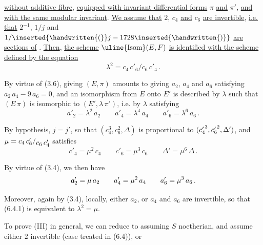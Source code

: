 %
\space
\uline{without additive fibre}, \uline{equipped with invariant differential forms} $\pi$ \uline{and} $\pi'$, \uline{and with the same modular invariant}. \uline{We assume that} $2$, $c_4$ \uline{and} $c_6$ \uline{are invertible}, \uline{i.e.} \uline{that} $2^{-1}$, $1/j$ and $1/\inserted{\handwritten{(}}j-1728\inserted{\handwritten{)}}$ \uline{are sections of} \reversemarginpar{}\normalmarginpar. \uline{Then}, \uline{the scheme} $\text{\uline{Isom}}(E,F)$ \uline{is identified with the scheme defined by the equation}
\[
\lambda^2=c_4\,c'_6/c_6\,c'_4 \, .
\]

By virtue of (3.6), giving $(E,\pi)$ amounts to giving $a_2$, $a_4$ and $a_6$ satisfying $a_2\,a_4-9\,a_6=0$, and an isomorphism from $E$ onto $E'$ is described by $\lambda$ such that $(E\,\pi)$ is isomorphic to $(E',\lambda\,\pi')$, i.e. by $\lambda$ satisfying
\[
a'_2=\lambda^2\,a_2 \qquad a'_4=\lambda^4\,a_4 \qquad a'_6=\lambda^6\,a_6 \, . \tag*{(6.4.1)}
\]

By hypothesis, $j=j'$, so that $(c_4^3,c_6^2,\Delta)$ is proportional to $(c_4^{\raisebox{-.38ex}{$\scriptstyle\prime$}\,3},c_6^{\raisebox{-.38ex}{$\scriptstyle\prime$}\,2},\Delta')$, and $\mu=c_4\,c'_6/\raisebox{-.52ex}{$c_6\,c'_4$}$ satisfies
\[
c'_4=\mu^2\,c_4 \qquad c'_6=\mu^3\,c_6 \qquad \Delta'=\mu^6\,\Delta \, . \tag*{(6.4.2)}
\]

By virtue of (3.4), we then have
\[
{\mathbb{\text{\makebox[0pt][l]{\kern.45pt$a$}$a$}}}'_2=\mu\,a_2 \qquad a'_4=\mu^2\,a_4 \qquad a'_6=\mu^3\,a_6 \, .
\]

Moreover, again by (3.4), locally, either $a_2$, or $a_4$ and $a_6$ are invertible, so that (6.4.1) is equivalent to $\lambda^2=\mu$.

To prove (III) in general, we can reduce to assuming $S$ noetherian, and assume either $2$ invertible (case treated in (6.4)), or%
